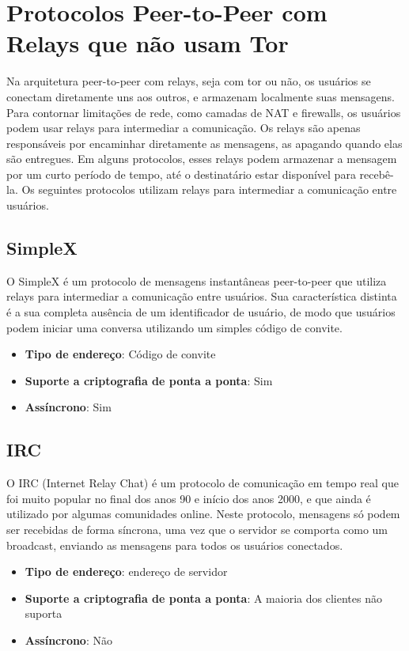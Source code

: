 \section{Protocolos Peer-to-Peer com Relays que não usam Tor}

Na arquitetura peer-to-peer com relays, seja com tor ou não, os usuários se conectam diretamente uns aos outros, e armazenam localmente suas mensagens. Para contornar limitações de rede, como camadas de NAT e firewalls, os usuários podem usar relays para intermediar a comunicação. Os relays são apenas responsáveis por encaminhar diretamente as mensagens, as apagando quando elas são entregues. Em alguns protocolos, esses relays podem armazenar a mensagem por um curto período de tempo, até o destinatário estar disponível para recebê-la. Os seguintes protocolos utilizam relays para intermediar a comunicação entre usuários.

\subsection{SimpleX}

O SimpleX é um protocolo de mensagens instantâneas peer-to-peer que utiliza relays para intermediar a comunicação entre usuários. Sua característica distinta é a sua completa ausência de um identificador de usuário, de modo que usuários podem iniciar uma conversa utilizando um simples código de convite. \cite{simplex}

\begin{itemize}
  \item \textbf{Tipo de endereço}: Código de convite
  \item \textbf{Suporte a criptografia de ponta a ponta}: Sim
  \item \textbf{Assíncrono}: Sim
\end{itemize}

\subsection{IRC}

O IRC (Internet Relay Chat) é um protocolo de comunicação em tempo real que foi muito popular no final dos anos 90 e início dos anos 2000, e que ainda é utilizado por algumas comunidades online. Neste protocolo, mensagens só podem ser recebidas de forma síncrona, uma vez que o servidor se comporta como um broadcast, enviando as mensagens para todos os usuários conectados. \cite{rfc2810}

\begin{itemize}
  \item \textbf{Tipo de endereço}: endereço de servidor
  \item \textbf{Suporte a criptografia de ponta a ponta}: A maioria dos clientes não suporta
  \item \textbf{Assíncrono}: Não
\end{itemize}

